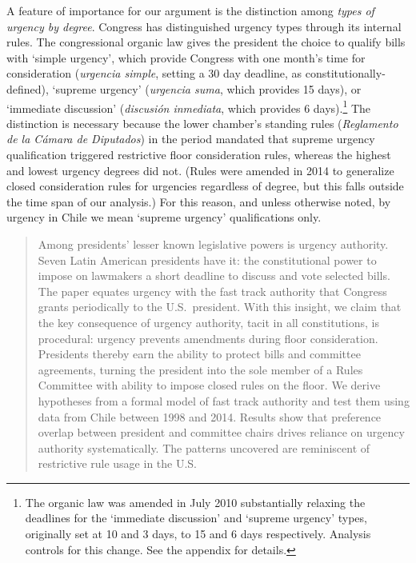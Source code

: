 A feature of importance for our argument is the distinction among \emph{types of urgency by degree}. Congress has distinguished urgency types through its internal rules. The congressional organic law gives the president the choice to qualify bills with `simple urgency', which provide Congress with one month's time for consideration (\emph{urgencia simple}, setting a 30 day deadline, as constitutionally-defined), `supreme urgency' (\emph{urgencia suma}, which provides 15 days), or `immediate discussion' (\emph{discusión inmediata}, which provides 6 days).\footnote{\label{fnRelax}The organic law was amended in July 2010 substantially relaxing the deadlines for the `immediate discussion' and `supreme urgency' types, originally set at 10 and 3 days, to 15 and 6 days respectively. Analysis controls for this change. See the appendix for details.} The distinction is necessary because the lower chamber's standing rules (\emph{Reglamento de la Cámara de Diputados}) in the period mandated that supreme urgency qualification triggered restrictive floor consideration rules, whereas the highest and lowest urgency degrees did not. (Rules were amended in 2014 to generalize closed consideration rules for urgencies regardless of degree, but this falls outside the time span of our analysis.) For this reason, and unless otherwise noted, by urgency in Chile we mean `supreme urgency' qualifications only. 




\begin{abstract}
\noindent  Among presidents' lesser known legislative powers is urgency authority. Seven Latin American presidents have it: the constitutional power to impose on lawmakers a short deadline to discuss and vote selected bills. The paper equates urgency with the fast track authority that Congress grants periodically to the U.S.\ president. With this insight, we claim that the key consequence of urgency authority, tacit in all constitutions, is procedural: urgency prevents amendments during floor consideration. Presidents thereby earn the ability to protect bills and committee agreements, turning the president into the sole member of a Rules Committee with ability to impose closed rules on the floor. We derive hypotheses from a formal model of fast track authority and test them using data from Chile between 1998 and 2014. Results show that preference overlap between president and committee chairs drives reliance on urgency authority systematically. The patterns uncovered are reminiscent of restrictive rule usage in the U.S.
\end{abstract}

